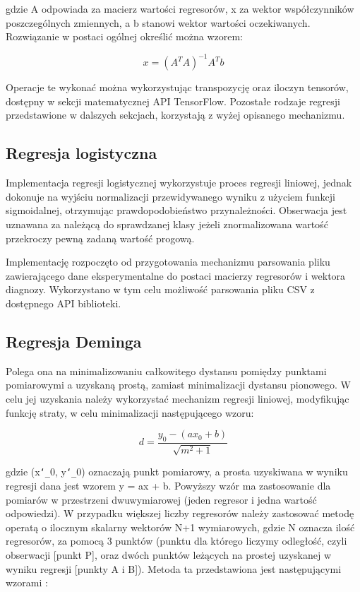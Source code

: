 gdzie A odpowiada za macierz wartości regresorów, x za wektor współczynników poszczególnych zmiennych, a b stanowi wektor wartości oczekiwanych. Rozwiązanie w postaci ogólnej określić można wzorem:

\begin{equation}
	x = (A^TA)^{-1}A^Tb
\end{equation}

Operacje te wykonać można wykorzystując transpozycję oraz iloczyn tensorów, dostępny w sekcji matematycznej API TensorFlow. Pozostałe rodzaje regresji przedstawione w dalszych sekcjach, korzystają z wyżej opisanego mechanizmu.

\subsection{Regresja logistyczna}

Implementacja regresji logistycznej wykorzystuje proces regresji liniowej, jednak dokonuje na wyjściu normalizacji przewidywanego wyniku z użyciem funkcji sigmoidalnej, otrzymując prawdopodobieństwo przynależności. Obserwacja jest uznawana za należącą do sprawdzanej klasy jeżeli znormalizowana wartość przekroczy pewną zadaną wartość progową.

Implementację rozpoczęto od przygotowania mechanizmu parsowania pliku zawierającego dane eksperymentalne do postaci macierzy regresorów i wektora diagnozy. Wykorzystano w tym celu możliwość parsowania pliku CSV z dostępnego API biblioteki.

\subsection{Regresja Deminga}

Polega ona na minimalizowaniu całkowitego dystansu pomiędzy punktami pomiarowymi a uzyskaną prostą, zamiast minimalizacji dystansu pionowego. W celu jej uzyskania należy wykorzystać mechanizm regresji liniowej, modyfikując funkcję straty, w celu minimalizacji następującego wzoru:

\begin{equation}
	d = \frac{y_0 - (ax_0 + b)}{\sqrt{m^2 + 1}}
\end{equation}

gdzie (x\texttt{\char`_}0, y\texttt{\char`_}0) oznaczają punkt pomiarowy, a prosta uzyskiwana w wyniku regresji dana jest wzorem y = ax + b. Powyższy wzór ma zastosowanie dla pomiarów w przestrzeni dwuwymiarowej (jeden regresor i jedna wartość odpowiedzi). W przypadku większej liczby regresorów należy zastosować metodę operatą o ilocznym skalarny wektorów N+1 wymiarowych, gdzie N oznacza ilość regresorów, za pomocą 3 punktów (punktu dla którego liczymy odległość, czyli obserwacji [punkt P], oraz dwóch punktów leżących na prostej uzyskanej w wyniku regresji [punkty A i B]). Metoda ta przedstawiona jest następującymi wzorami \cite{engineeringstackdistance}:

